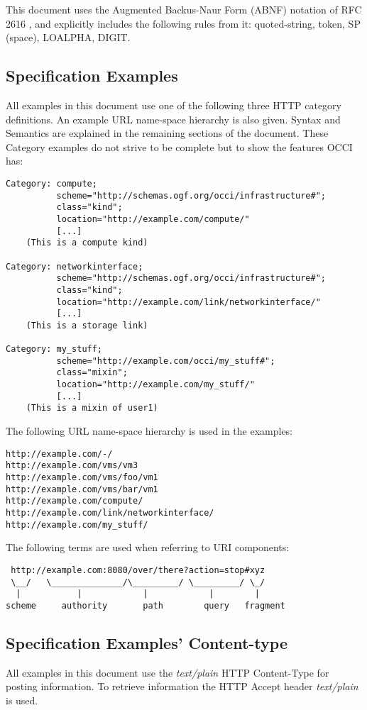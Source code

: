 \documentclass[10pt,a4paper]{article}
\begin{document}
This document uses the Augmented Backus-Naur Form (ABNF) notation of
RFC 2616 \cite{rfc2616}, and explicitly includes the following rules
from it: quoted-string, token, SP (space), LOALPHA, DIGIT.

\subsection{Specification Examples}
All examples in this document use one of the following three HTTP
category definitions. An example URL name-space hierarchy is also
given. Syntax and Semantics are explained in the remaining sections of
the document. These Category examples do not strive to be complete but
to show the features OCCI has:

\begin{verbatim}
Category: compute;
          scheme="http://schemas.ogf.org/occi/infrastructure#";
          class="kind";
          location="http://example.com/compute/"
          [...]
    (This is a compute kind)

Category: networkinterface;
          scheme="http://schemas.ogf.org/occi/infrastructure#";
          class="kind";
          location="http://example.com/link/networkinterface/"
          [...]
    (This is a storage link)

Category: my_stuff;
          scheme="http://example.com/occi/my_stuff#";
          class="mixin";
          location="http://example.com/my_stuff/"
          [...]
    (This is a mixin of user1)
\end{verbatim}
The following URL name-space hierarchy is used in the examples:
\begin{verbatim}
http://example.com/-/
http://example.com/vms/vm3
http://example.com/vms/foo/vm1
http://example.com/vms/bar/vm1
http://example.com/compute/
http://example.com/link/networkinterface/
http://example.com/my_stuff/
\end{verbatim}

The following terms \cite{rfc3986} are used when referring to URI
components:

\begin{verbatim}
 http://example.com:8080/over/there?action=stop#xyz
 \__/   \______________/\_________/ \_________/ \_/
  |           |            |            |        |
scheme     authority       path        query   fragment
\end{verbatim}

\subsection{Specification Examples' Content-type}
All examples in this document use the \emph{text/plain} HTTP
Content-Type for posting information. To retrieve information the HTTP
Accept header \emph{text/plain} is used.
\end{document}
